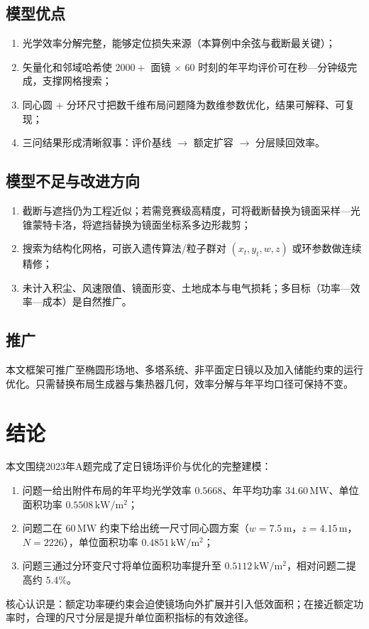 \documentclass[withoutpreface,bwprint]{cumcmthesis}
\begin{document}
\subsection{模型优点}
\begin{enumerate}[leftmargin=2em]
  \item 光学效率分解完整，能够定位损失来源（本算例中余弦与截断最关键）；
  \item 矢量化和邻域哈希使 $2000+$ 面镜 $\times$ $60$ 时刻的年平均评价可在秒—分钟级完成，支撑网格搜索；
  \item 同心圆 + 分环尺寸把数千维布局问题降为数维参数优化，结果可解释、可复现；
  \item 三问结果形成清晰叙事：评价基线 $\to$ 额定扩容 $\to$ 分层赎回效率。
\end{enumerate}

\subsection{模型不足与改进方向}
\begin{enumerate}[leftmargin=2em]
  \item 截断与遮挡仍为工程近似；若需竞赛级高精度，可将截断替换为镜面采样—光锥蒙特卡洛，将遮挡替换为镜面坐标系多边形裁剪；
  \item 搜索为结构化网格，可嵌入遗传算法/粒子群对 $(x_t,y_t,w,z)$ 或环参数做连续精修；
  \item 未计入积尘、风速限值、镜面形变、土地成本与电气损耗；多目标（功率—效率—成本）是自然推广。
\end{enumerate}

\subsection{推广}
本文框架可推广至椭圆形场地、多塔系统、非平面定日镜以及加入储能约束的运行优化。只需替换布局生成器与集热器几何，效率分解与年平均口径可保持不变。

\section{结论}

本文围绕2023年A题完成了定日镜场评价与优化的完整建模：
\begin{enumerate}[leftmargin=2em]
  \item 问题一给出附件布局的年平均光学效率 $0.5668$、年平均功率 $34.60\,\mathrm{MW}$、单位面积功率 $0.5508\,\mathrm{kW/m^2}$；
  \item 问题二在 $60\,\mathrm{MW}$ 约束下给出统一尺寸同心圆方案（$w=7.5\,\mathrm{m}$，$z=4.15\,\mathrm{m}$，$N=2226$），单位面积功率 $0.4851\,\mathrm{kW/m^2}$；
  \item 问题三通过分环变尺寸将单位面积功率提升至 $0.5112\,\mathrm{kW/m^2}$，相对问题二提高约 $5.4\%$。
\end{enumerate}
核心认识是：额定功率硬约束会迫使镜场向外扩展并引入低效面积；在接近额定功率时，合理的尺寸分层是提升单位面积指标的有效途径。
\end{document}
